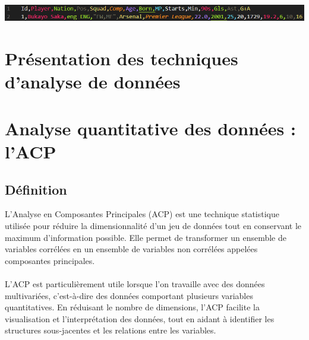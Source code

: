 \documentclass[12pt]{scrartcl}
\begin{document}
            \begin{center}
                \includegraphics[width=1\textwidth]{images/exemple_entree.png}
            \end{center}    



    \section{Présentation des techniques d'analyse de données}



    \section{Analyse quantitative des données : l'ACP}

        \subsection{Définition}
            L'Analyse en Composantes Principales (ACP) est une technique statistique utilisée pour réduire la dimensionnalité d'un jeu de données tout en conservant le maximum d'information possible. Elle permet de transformer un ensemble de variables corrélées en un ensemble de variables non corrélées appelées composantes principales.\\\\
            L'ACP est particulièrement utile lorsque l'on travaille avec des données multivariées, c'est-à-dire des données comportant plusieurs variables quantitatives. En réduisant le nombre de dimensions, l'ACP facilite la visualisation et l'interprétation des données, tout en aidant à identifier les structures sous-jacentes et les relations entre les variables.\\
\end{document}
